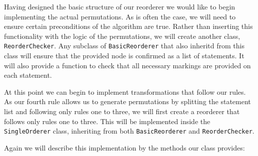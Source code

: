 \documentclass[twoside,a4paper]{report}
\begin{document}
Having designed the basic structure of our reorderer we would like to begin implementing the actual permutations. As is often the case, we will need to
ensure certain preconditions of the algorithm are true. Rather than inserting this functionality with the logic of the permutations, we will create
another class, \texttt{ReorderChecker}. Any subclass of \texttt{BasicReorderer} that also inheritd from this class will ensure that the provided node
is confirmed as a list of statements. It will also provide a function to check that all necessary markings are provided on each statement.

At this point we can begin to implement transformations that follow our rules. As our fourth rule allows us to generate permutations by splitting the
statement list and following only rules one to three, we will first create a reorderer that follows only rules one to three. This will be implemented
inside the \texttt{SingleOrderer} class, inheriting from both \texttt{BasicReorderer} and \texttt{ReorderChecker}.

Again we will describe this implementation by the methods our class provides:
\end{document}

